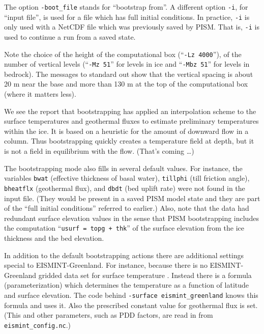 The option \texttt{-boot_file} stands for ``bootstrap from''.  A different option \texttt{-i}, for ``input file'', is used for a file which has full initial conditions.  In practice, \texttt{-i} is only used with a NetCDF file which was previously saved by PISM.  That is, \texttt{-i} is used to continue a run from a saved state.

Note the choice of the height of the computational box (``\texttt{-Lz 4000}''), of the number of vertical levels (``\texttt{-Mz 51}'' for levels in ice and ``\texttt{-Mbz 51}'' for levels in bedrock). The messages to standard out show that the vertical spacing is about 20 m near the base and more than 130 m at the top of the computational box (where it matters less).

We see the report that bootstrapping has applied an interpolation scheme to the surface temperatures and geothermal fluxes to estimate preliminary temperatures within the ice.  It is based on a heuristic for the amount of downward flow in a column.  Thus bootstrapping quickly creates a temperature field at depth, but it is not a field in equilibrium with the flow.  (That's coming \dots)

The bootstrapping mode also fills in several default values.  For instance, the variables \texttt{bwat} (effective thickness of basal water), \texttt{tillphi} (till friction angle), \texttt{bheatflx} (geothermal flux), and \texttt{dbdt} (bed uplift rate) were not found in the input file.   (They would be present in a saved PISM model state and they are part of the ``full initial conditions'' referred to earlier.)  Also, note that the data had redundant surface elevation values in the sense that PISM bootstrapping includes the computation ``\texttt{usurf = topg + thk}'' of the surface elevation from the ice thickness and the bed elevation.

In addition to the default bootstrapping actions there are additional settings special to EISMINT-Greenland.  For instance, because there is no EISMINT-Greenland gridded data set for surface temperature \cite{RitzEISMINT}.  Instead there is a formula (parameterization) which determines the temperature as a function of latitude and surface elevation.  The code behind \texttt{-surface eismint_greenland} knows this formula and uses it.  Also the prescribed constant value for geothermal flux is set.
(This and other parameters, such as PDD factors, are read in from \texttt{eismint_config.nc}.)

